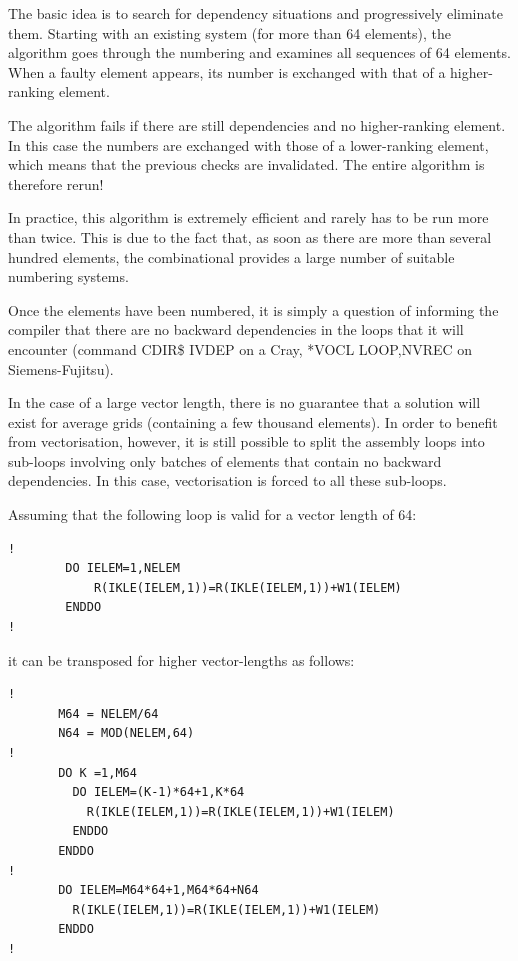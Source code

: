 
The basic idea is to search for dependency situations and progressively
eliminate them. Starting with an existing system (for more than 64 elements),
the algorithm goes through the numbering and examines all sequences of 64
elements. When a faulty element appears, its number is exchanged with that of a
higher-ranking element.

The algorithm fails if there are still dependencies and no higher-ranking
element. In this case the numbers are exchanged with those of a lower-ranking
element, which means that the previous checks are invalidated. The entire
algorithm is therefore rerun!

In practice, this algorithm is extremely efficient and rarely has to be run
more than twice. This is due to the fact that, as soon as there are more than
several hundred elements, the combinational provides a large number of suitable
numbering systems.

Once the elements have been numbered, it is simply a question of informing the
compiler that there are no backward dependencies in the loops that it will
encounter (command CDIR\$ IVDEP on a Cray, *VOCL LOOP,NVREC on
Siemens-Fujitsu).

In the case of a large vector length, there is no guarantee that a solution
will exist for average grids (containing a few thousand elements). In order to
benefit from vectorisation, however, it is still possible to split the assembly
loops into sub-loops involving only batches of elements that contain no
backward dependencies. In this case, vectorisation is forced to all these
sub-loops.

Assuming that the following loop is valid for a vector length of 64:

\begin{lstlisting}[language=TelFortran]
!
        DO IELEM=1,NELEM
            R(IKLE(IELEM,1))=R(IKLE(IELEM,1))+W1(IELEM)
        ENDDO
!
\end{lstlisting}

it can be transposed for higher vector-lengths as follows:
\begin{lstlisting}[language=TelFortran]
!
       M64 = NELEM/64
       N64 = MOD(NELEM,64)
!
       DO K =1,M64
         DO IELEM=(K-1)*64+1,K*64
           R(IKLE(IELEM,1))=R(IKLE(IELEM,1))+W1(IELEM)
         ENDDO
       ENDDO
!
       DO IELEM=M64*64+1,M64*64+N64
         R(IKLE(IELEM,1))=R(IKLE(IELEM,1))+W1(IELEM)
       ENDDO
!
\end{lstlisting}

